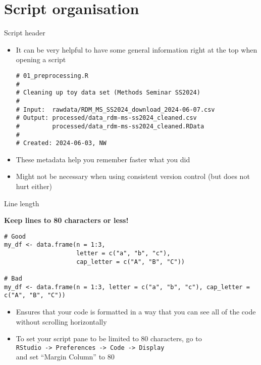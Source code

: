 \documentclass[aspectratio=169]{beamer}
\begin{document}

\section{Script organisation}

\begin{frame}[fragile]{Script header}
  \begin{itemize}
    \item It can be very helpful to have some general information right at the
      top when opening a script
      \begin{lstlisting}
# 01_preprocessing.R
#
# Cleaning up toy data set (Methods Seminar SS2024)
#
# Input:  rawdata/RDM_MS_SS2024_download_2024-06-07.csv
# Output: processed/data_rdm-ms-ss2024_cleaned.csv
#         processed/data_rdm-ms-ss2024_cleaned.RData
#
# Created: 2024-06-03, NW
      \end{lstlisting}
    \item These metadata help you remember faster what you did
    \item Might not be necessary when using consistent version control (but does
      not hurt either)
  \end{itemize}
\end{frame}

\begin{frame}[fragile]{Line length}
  {}
  \begin{center}
    {\Large\bf Keep lines to 80 characters or less!}
  \end{center}
  \begin{lstlisting}
# Good
my_df <- data.frame(n = 1:3,
                    letter = c("a", "b", "c"),
                    cap_letter = c("A", "B", "C"))

# Bad
my_df <- data.frame(n = 1:3, letter = c("a", "b", "c"), cap_letter = c("A", "B", "C"))
  \end{lstlisting}
  \begin{itemize}
    \item Ensures that your code is formatted in a way that you can see all of
      the code without scrolling horizontally
    \item To set your script pane to be limited to 80 characters, go to\\
      \verb+RStudio -> Preferences -> Code -> Display+\\
      and set ``Margin Column'' to 80
  \end{itemize}
\end{frame}
\end{document}
